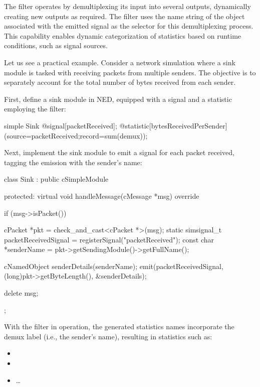 \begin{ned}
The  filter operates by demultiplexing its input into several
outputs, dynamically creating new outputs as required. The filter uses the name
string of the  object associated with the emitted signal as the
selector for this demultiplexing process. This capability enables dynamic
categorization of statistics based on runtime conditions, such as signal
sources.

Let us see a practical example. Consider a network simulation where a sink
module is tasked with receiving packets from multiple senders. The objective is
to separately account for the total number of bytes received from each sender.

First, define a sink module in NED, equipped with a signal and a statistic
employing the  filter:

\begin{ned}
simple Sink {
    @signal[packetReceived];
    @statistic[bytesReceivedPerSender](source=packetReceived;record=sum(demux));
}
\end{ned}

Next, implement the sink module to emit a signal for each packet received,
tagging the emission with the sender's name:

\begin{cpp}
class Sink : public cSimpleModule {
  protected:
    virtual void handleMessage(cMessage *msg) override {
        if (msg->isPacket()) {
            cPacket *pkt = check_and_cast<cPacket *>(msg);
            static simsignal_t packetReceivedSignal = registerSignal("packetReceived");
            const char *senderName = pkt->getSendingModule()->getFullName();

            cNamedObject senderDetails(senderName);
            emit(packetReceivedSignal, (long)pkt->getByteLength(), &senderDetails);

            delete msg;
        }
    }
};
\end{cpp}

With the  filter in operation, the generated statistics names
incorporate the demux label (i.e., the sender's name), resulting in statistics
such as:

\begin{itemize}
    \item {}
    \item {}
    \item \ldots
\end{itemize}


\end{ned}
